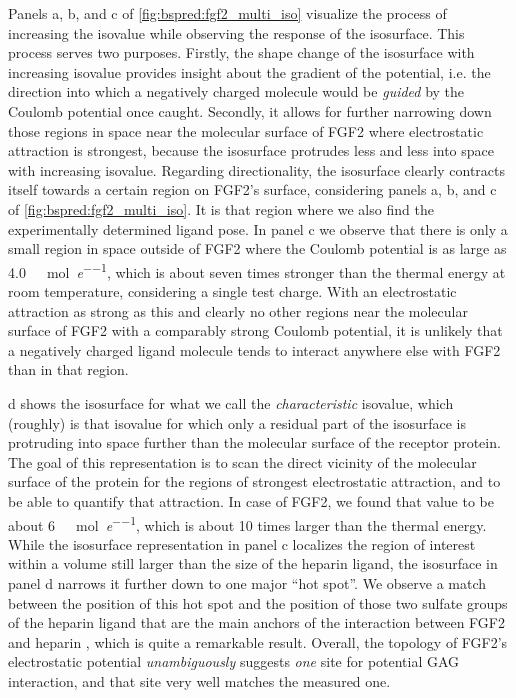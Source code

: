 Panels a, b, and c of \cref{fig:bspred:fgf2_multi_iso} visualize the process of
increasing the isovalue while observing the response of the isosurface. This
process serves two purposes. Firstly, the shape change of the isosurface with
increasing isovalue provides insight about the gradient of the potential, i.e.
the direction into which a negatively charged molecule would be \textit{guided}
by the Coulomb potential once caught. Secondly, it allows for further narrowing
down those regions in space near the molecular surface of FGF2 where
electrostatic attraction is strongest, because the isosurface protrudes less and
less into space with increasing isovalue. Regarding directionality, the
isosurface clearly contracts itself towards a certain region on FGF2's surface,
considering panels a, b, and c of \cref{fig:bspred:fgf2_multi_iso}. It is that
region where we also find the experimentally determined ligand pose. In panel c
we observe that there is only a small region in space outside of FGF2 where the
Coulomb potential is as large as
\SI{4.0}{\kilo\calory\per\mole\per\elementarycharge}, which is about seven times
stronger than the thermal energy at room temperature, considering a single test
charge. With an electrostatic attraction as strong as this and clearly no other
regions near the molecular surface of FGF2 with a comparably strong Coulomb
potential, it is unlikely that a negatively charged ligand molecule tends to
interact anywhere else with FGF2 than in that region.

d shows the isosurface for what we call the
\textit{characteristic} isovalue, which (roughly) is that isovalue for which
only a residual part of the isosurface is protruding into space further than the
molecular surface of the receptor protein. The goal of this representation is to
scan the direct vicinity of the molecular surface of the protein for the regions
of strongest electrostatic attraction, and to be able to quantify that
attraction. In case of FGF2, we found that value to be about
\SI{6}{\kilo\calory\per\mole\per\elementarycharge}, which is about 10 times
larger than the thermal energy. While the isosurface representation in panel c
localizes the region of interest within a volume still larger than the size of
the heparin ligand, the isosurface in panel d narrows it further down to one
major \enquote{hot spot}. We observe a match between the position of this hot
spot and the position of those two sulfate groups of the heparin ligand that are
the main anchors of the interaction between FGF2 and heparin
\cite{faham_heparin_1996}, which is quite a remarkable result. Overall, the
topology of FGF2's electrostatic potential \textit{unambiguously} suggests
\textit{one} site for potential GAG interaction, and that site very well matches
the measured one.


